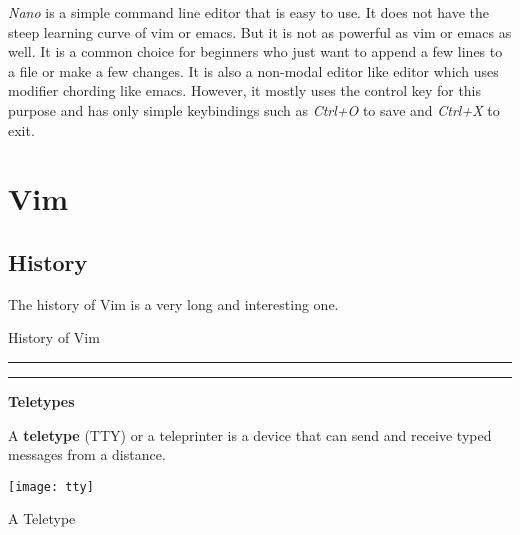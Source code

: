 \textit{Nano} is a simple command line editor that is easy to use.
It does not have the steep learning curve of vim or emacs.
But it is not as powerful as vim or emacs as well.
It is a common choice for beginners who just want to append a few lines to a file or make a few changes.
It is also a non-modal editor like editor which uses modifier chording like emacs.
However, it mostly uses the control key for this purpose and has only simple
keybindings such as \textit{Ctrl+O} to save and \textit{Ctrl+X} to exit.

\section{Vim}

\subsection{History}

The history of Vim is a very long and interesting one.

\begin{table*}[h!]
\caption{History of Vim}
\centering
\begin{minipage}[t]{.7\linewidth}
\color{gray}
\rule{\linewidth}{1pt}
\bigskip
\rule{\linewidth}{1pt}
\end{minipage}
\end{table*}

\textbf{Teletypes}

\begin{definition}
A \textbf{teletype} (TTY) or a teleprinter is a device that can send and receive typed messages from a distance.
\end{definition}

\begin{marginfigure}
  \texttt{[image: tty]}
  \caption{A Teletype}
\end{marginfigure}

